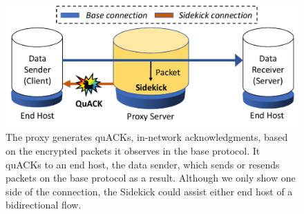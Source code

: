 \begin{figure}[t]
	\centering
	\includegraphics[width=0.8\linewidth]{sidekick/figures/sc_protocol.pdf}
\caption{The proxy generates quACKs, in-network acknowledgments, based on
the encrypted packets it observes in the base protocol. It quACKs to an end
host, the data sender, which sends or resends packets on the base protocol as a result.
Although we only show one side of the connection, the Sidekick could assist
either end host of a bidirectional flow.
}
\label{fig:sidekick:overview}
\end{figure}
